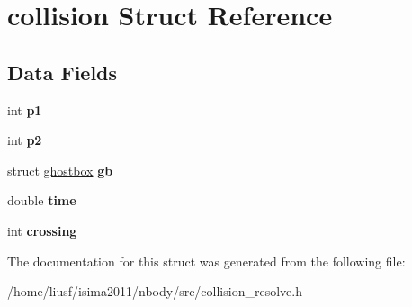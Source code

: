 \hypertarget{structcollision}{
\section{collision Struct Reference}
\label{structcollision}
}
\subsection*{Data Fields}
\begin{DoxyCompactItemize}
\item 
\hypertarget{structcollision_a493adcb1f84fc10328d0cbe6a1a6de29}{
int {\bfseries p1}}
\label{structcollision_a493adcb1f84fc10328d0cbe6a1a6de29}

\item 
\hypertarget{structcollision_a756aa40e6bfe8384753c9b02d644cca9}{
int {\bfseries p2}}
\label{structcollision_a756aa40e6bfe8384753c9b02d644cca9}

\item 
\hypertarget{structcollision_a907df4c54ef7641652d439fee3a861ad}{
struct \hyperlink{structghostbox}{ghostbox} {\bfseries gb}}
\label{structcollision_a907df4c54ef7641652d439fee3a861ad}

\item 
\hypertarget{structcollision_a36135b63977ab989f4a3c2393d1a1db1}{
double {\bfseries time}}
\label{structcollision_a36135b63977ab989f4a3c2393d1a1db1}

\item 
\hypertarget{structcollision_ae1c4e107265d6fd559a3c81b4404d33f}{
int {\bfseries crossing}}
\label{structcollision_ae1c4e107265d6fd559a3c81b4404d33f}

\end{DoxyCompactItemize}


The documentation for this struct was generated from the following file:\begin{DoxyCompactItemize}
\item 
/home/liusf/isima2011/nbody/src/collision\_\-resolve.h\end{DoxyCompactItemize}
